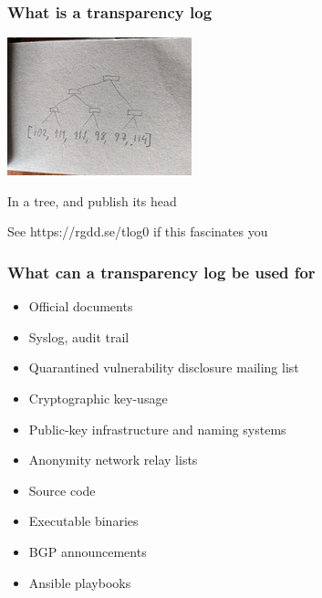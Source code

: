 \begin{frame}
  \frametitle{What is a transparency log}
  \centerline{\includegraphics{img/tree6_s}}
  \centerline{In a tree, and publish its head}
  \pause
  \centerline{See https://rgdd.se/tlog0 if this fascinates you}
\end{frame}

\begin{frame}
  \frametitle{What can a transparency log be used for}

  \begin{itemize}
  \item Official documents
  \item Syslog, audit trail
  \item Quarantined vulnerability disclosure mailing list
  \item Cryptographic key-usage
  \item Public-key infrastructure and naming systems
  \item Anonymity network relay lists
  \item Source code
  \item Executable binaries
  \item BGP announcements
  \item Ansible playbooks
  \end{itemize}

\end{frame}

